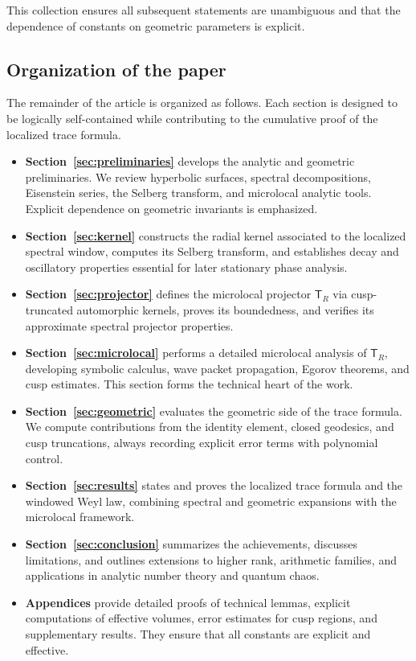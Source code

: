 This collection ensures all subsequent statements are unambiguous and that the dependence
of constants on geometric parameters is explicit.

\subsection{Organization of the paper}\label{subsec:outline}

The remainder of the article is organized as follows. Each section is designed to be
logically self-contained while contributing to the cumulative proof of the localized
trace formula.

\begin{itemize}
  \item \textbf{Section~\ref{sec:preliminaries}} develops the analytic and geometric
        preliminaries. We review hyperbolic surfaces, spectral decompositions, Eisenstein
        series, the Selberg transform, and microlocal analytic tools. Explicit dependence
        on geometric invariants is emphasized.
  \item \textbf{Section~\ref{sec:kernel}} constructs the radial kernel associated to the
        localized spectral window, computes its Selberg transform, and establishes decay
        and oscillatory properties essential for later stationary phase analysis.
  \item \textbf{Section~\ref{sec:projector}} defines the microlocal projector
        $\mathsf{T}_R$ via cusp-truncated automorphic kernels, proves its boundedness, and
        verifies its approximate spectral projector properties.
  \item \textbf{Section~\ref{sec:microlocal}} performs a detailed microlocal analysis of
        $\mathsf{T}_R$, developing symbolic calculus, wave packet propagation, Egorov
        theorems, and cusp estimates. This section forms the technical heart of the work.
  \item \textbf{Section~\ref{sec:geometric}} evaluates the geometric side of the trace
        formula. We compute contributions from the identity element, closed geodesics, and
        cusp truncations, always recording explicit error terms with polynomial control.
  \item \textbf{Section~\ref{sec:results}} states and proves the localized trace formula
        and the windowed Weyl law, combining spectral and geometric expansions with the
        microlocal framework.
  \item \textbf{Section~\ref{sec:conclusion}} summarizes the achievements, discusses
        limitations, and outlines extensions to higher rank, arithmetic families, and
        applications in analytic number theory and quantum chaos.
  \item \textbf{Appendices} provide detailed proofs of technical lemmas, explicit
        computations of effective volumes, error estimates for cusp regions, and
        supplementary results. They ensure that all constants are explicit and effective.
\end{itemize}

